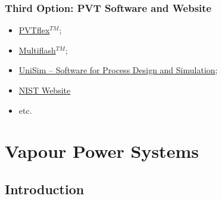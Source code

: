 \documentclass[10pt,compress]{beamer}
\begin{document}

\begin{frame}
  \frametitle{Third Option: PVT Software and Website}
\noindent
\begin{itemize}
   \item<1-> \href{http://www.weatherford.com/doc/wft183650}{PVTflex$^{TM}$};
   \item<1-> \href{http://www.kbcat.com/infochem-software/flow-assurance-software-multiflash/pvt-simulation}{Multiflash$^{TM}$};
   \item<1-> \href{https://www.honeywellprocess.com/en-US/explore/products/advanced-applications/unisim/Pages/default.aspx}{UniSim – Software for Process Design and Simulation};
   \item<1-> \href{http://webbook.nist.gov/chemistry/fluid/}{NIST Website}
   \item<1-> etc.
\end{itemize}

\end{frame}



\section{Vapour Power Systems}

\subsection{Introduction}
\end{document}
